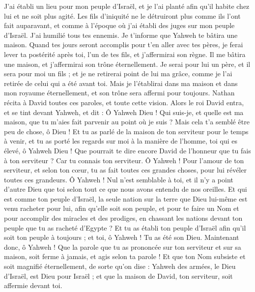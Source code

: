 \begin{multicols}{2}
J'ai établi un lieu pour mon peuple d'Israël, et je l'ai planté afin qu'il habite chez lui et ne soit plus agité. Les fils d'iniquité ne le détruiront plus comme ils l'ont fait auparavant,
et comme à l'époque où j'ai établi des juges sur mon peuple d'Israël. J'ai humilié tous tes ennemis. Je t'informe que Yahweh te bâtira une maison.
Quand tes jours seront accomplis pour t'en aller avec tes pères, je ferai lever ta postérité après toi, l'un de tes fils, et j'affermirai son règne.
Il me bâtira une maison, et j'affermirai son trône éternellement.
Je serai pour lui un père, et il sera pour moi un fils ; et je ne retirerai point de lui ma grâce, comme je l'ai retirée de celui qui a été avant toi.
Mais je l'établirai dans ma maison et dans mon royaume éternellement, et son trône sera affermi pour toujours.
Nathan récita à David toutes ces paroles, et toute cette vision.
Alors le roi David entra, et se tint devant Yahweh, et dit : Ô Yahweh Dieu ! Qui suis-je, et quelle est ma maison, que tu m'aies fait parvenir au point où je suis ?
Mais cela t'a semblé être peu de chose, ô Dieu ! Et tu as parlé de la maison de ton serviteur pour le temps à venir, et tu as porté les regards sur moi à la manière de l'homme, toi qui es élevé, ô Yahweh Dieu !
Que pourrait te dire encore David de l'honneur que tu fais à ton serviteur ? Car tu connais ton serviteur.
Ô Yahweh ! Pour l'amour de ton serviteur, et selon ton cœur, tu as fait toutes ces grandes choses, pour lui révéler toutes ces grandeurs.
Ô Yahweh ! Nul n'est semblable à toi, et il n'y a point d'autre Dieu que toi selon tout ce que nous avons entendu de nos oreilles.
Et qui est comme ton peuple d'Israël, la seule nation sur la terre que Dieu lui-même est venu racheter pour lui, afin qu'elle soit son peuple, et pour te faire un Nom et pour accomplir des miracles et des prodiges, en chassant les nations devant ton peuple que tu as racheté d'Egypte ?
Et tu as établi ton peuple d'Israël afin qu'il soit ton peuple à toujours ; et toi, ô Yahweh ! Tu as été son Dieu.
Maintenant donc, ô Yahweh ! Que la parole que tu as prononcée sur ton serviteur et sur sa maison, soit ferme à jamais, et agis selon ta parole !
Et que ton Nom subsiste et soit magnifié éternellement, de sorte qu'on dise : Yahweh des armées, le Dieu d'Israël, est Dieu pour Israël ; et que la maison de David, ton serviteur, soit affermie devant toi.

\end{multicols}
